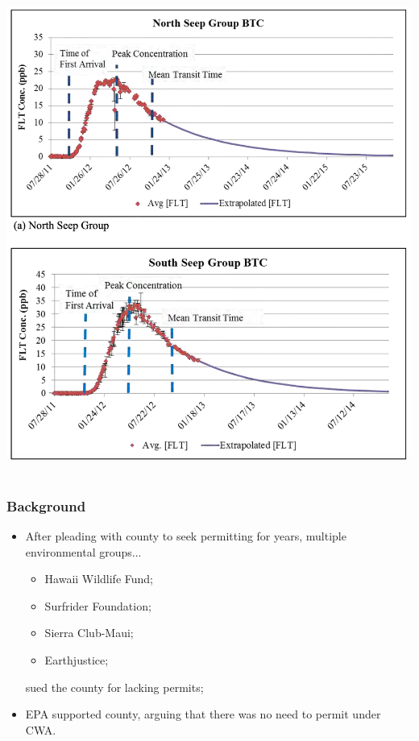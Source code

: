 \documentclass[aspectratio=169]{beamer}
\theoremstyle{principle}
\begin{document}
\begin{frame}
\begin{columns}
\begin{column}{0.5\textwidth}  %
    \begin{center}
     \includegraphics[scale=0.28]{dye_timing.png}
     \end{center}
\end{column}

\end{columns}
\end{frame}



\begin{frame}
\frametitle{Background}

\begin{itemize}

\item After pleading with county to seek permitting for years, multiple environmental groups...
\begin{itemize}
\item Hawaii Wildlife Fund;
\item Surfrider Foundation;
\item Sierra Club-Maui;
\item Earthjustice;
\end{itemize}
sued the county for lacking permits;
\bigskip
\bigskip
\bigskip
\item EPA supported county, arguing that there was no need to permit under CWA.
\end{itemize}

\end{frame}
\end{document}
